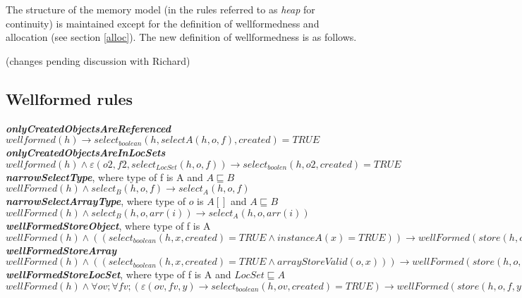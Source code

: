\documentclass{article}
\begin{document}
	The structure of the memory model (in the rules referred to as \textit{heap} for continuity) is maintained except for the definition of wellformedness and allocation (see section \ref{alloc}). The new definition of wellformedness is as follows. 
	
	(changes pending discussion with Richard)
	
	\subsection{Wellformed rules} \label{wellformedrules}
	\textit{\textbf{onlyCreatedObjectsAreReferenced}} \\
	$wellformed(h) \to select_{boolean} (h,selectA (h,o,f), created) = TRUE$ \\
	
	\textit{\textbf{onlyCreatedObjectsAreInLocSets}} \\
	$wellformed(h) \land \varepsilon (o2, f2,select_{LocSet}(h,o, f)) \to  select_{boolen}(h,o2, created) = TRUE $\\
		
	\textit{\textbf{narrowSelectType}},  where type of f is A and $A \sqsubseteq B$ \\
	$wellFormed(h) \land select_B(h,o, f) \to select_A(h,o, f)$\\
		
	\textit{\textbf{narrowSelectArrayType}},  where type of $o$ is $A[]$ and $A \sqsubseteq B$  \\
	$wellFormed(h) \land select_B(h,o,arr(i)) \to select_A(h,o,arr(i))$\\
	
	\textit{\textbf{wellFormedStoreObject}}, where type of f is A \\
	$wellFormed(h) \land ((select_{boolean}(h, x, created) = TRUE \land instanceA(x) = TRUE)) \to wellFormed(store(h,o, f, x))$\\
	
	\textit{\textbf{wellFormedStoreArray}} \\
	$wellFormed(h) \land ( (select_{boolean}(h, x, created) = TRUE \land arrayStoreValid(o, x)))
	\to wellFormed(store(h,o,arr(idx), x)))$\\
	
	\textit{\textbf{wellFormedStoreLocSet}}, where type of f is A and $LocSet \sqsubseteq A$ \\
	$wellFormed(h)\land \forall ov;\forall f v;(\varepsilon (ov, f v, y) \to select_{boolean}(h,ov, created) = TRUE) \to wellFormed(store(h,o, f, y)) $\\
	
\end{document}
